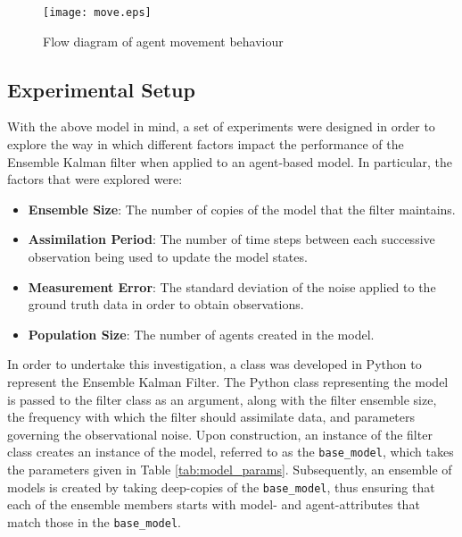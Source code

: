 

\begin{figure}[h]
    \centering
    \texttt{[image: move.eps]}
    \caption{Flow diagram of agent movement behaviour}\label{fig:move}
\end{figure}

\subsection{Experimental Setup}\label{sub:method:experiments}

With the above model in mind, a set of experiments were designed in order to
explore the way in which different factors impact the performance of the
Ensemble Kalman filter when applied to an agent-based model.
In particular, the factors that were explored were:
\begin{itemize}
    \item \textbf{Ensemble Size}: The number of copies of the model that the
        filter maintains.
    \item \textbf{Assimilation Period}: The number of time steps between each
        successive observation being used to update the model states.
    \item \textbf{Measurement Error}: The standard deviation of the noise
        applied to the ground truth data in order to obtain observations.
    \item \textbf{Population Size}: The number of agents created in the model.
\end{itemize}

In order to undertake this investigation, a class was developed in Python to
represent the Ensemble Kalman Filter.
The Python class representing the model is passed to the filter class as an
argument, along with the filter ensemble size, the frequency with which the
filter should assimilate data, and parameters governing the observational noise.
Upon construction, an instance of the filter class creates an instance of the
model, referred to as the \texttt{base\_model}, which takes the parameters given
in Table \ref{tab:model_params}.
Subsequently, an ensemble of models is created by taking deep-copies of the
\texttt{base\_model}, thus ensuring that each of the ensemble members starts
with model- and agent-attributes that match those in the \texttt{base\_model}.

